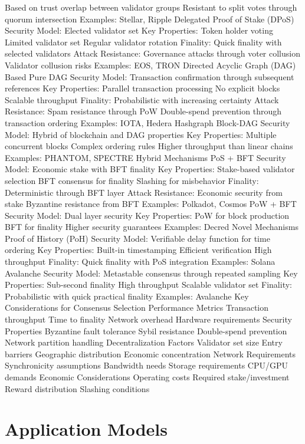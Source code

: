 \documentclass[
  letterpaper,
  DIV=11,
  numbers=noendperiod]{scrreprt}
\begin{document}
Based on trust overlap between validator groups Resistant to split votes
through quorum intersection Examples: Stellar, Ripple Delegated Proof of
Stake (DPoS) Security Model: Elected validator set Key Properties: Token
holder voting Limited validator set Regular validator rotation Finality:
Quick finality with selected validators Attack Resistance: Governance
attacks through voter collusion Validator collusion risks Examples: EOS,
TRON Directed Acyclic Graph (DAG) Based Pure DAG Security Model:
Transaction confirmation through subsequent references Key Properties:
Parallel transaction processing No explicit blocks Scalable throughput
Finality: Probabilistic with increasing certainty Attack Resistance:
Spam resistance through PoW Double-spend prevention through transaction
ordering Examples: IOTA, Hedera Hashgraph Block-DAG Security Model:
Hybrid of blockchain and DAG properties Key Properties: Multiple
concurrent blocks Complex ordering rules Higher throughput than linear
chains Examples: PHANTOM, SPECTRE Hybrid Mechanisms PoS + BFT Security
Model: Economic stake with BFT finality Key Properties: Stake-based
validator selection BFT consensus for finality Slashing for misbehavior
Finality: Deterministic through BFT layer Attack Resistance: Economic
security from stake Byzantine resistance from BFT Examples: Polkadot,
Cosmos PoW + BFT Security Model: Dual layer security Key Properties: PoW
for block production BFT for finality Higher security guarantees
Examples: Decred Novel Mechanisms Proof of History (PoH) Security Model:
Verifiable delay function for time ordering Key Properties: Built-in
timestamping Efficient verification High throughput Finality: Quick
finality with PoS integration Examples: Solana Avalanche Security Model:
Metastable consensus through repeated sampling Key Properties:
Sub-second finality High throughput Scalable validator set Finality:
Probabilistic with quick practical finality Examples: Avalanche Key
Considerations for Consensus Selection Performance Metrics Transaction
throughput Time to finality Network overhead Hardware requirements
Security Properties Byzantine fault tolerance Sybil resistance
Double-spend prevention Network partition handling Decentralization
Factors Validator set size Entry barriers Geographic distribution
Economic concentration Network Requirements Synchronicity assumptions
Bandwidth needs Storage requirements CPU/GPU demands Economic
Considerations Operating costs Required stake/investment Reward
distribution Slashing conditions

\section{Application Models}\label{application-models}
\end{document}
